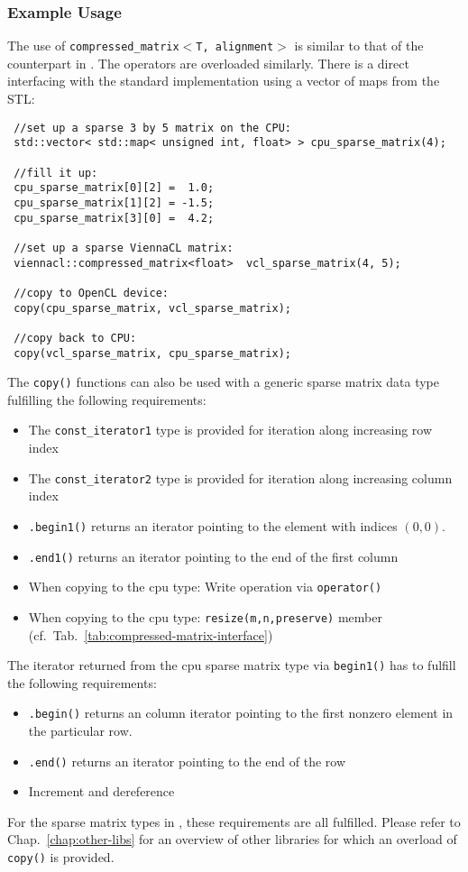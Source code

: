 \subsubsection{Example Usage} \label{sec:compressed-matrix-example}
The use of \texttt{compressed\_matrix$<$T, alignment$>$} is similar to that of the counterpart in {\ublas}. The operators are overloaded similarly.
There is a direct interfacing with the standard implementation using a vector of maps from the STL:
\begin{lstlisting}
 //set up a sparse 3 by 5 matrix on the CPU:
 std::vector< std::map< unsigned int, float> > cpu_sparse_matrix(4);

 //fill it up:
 cpu_sparse_matrix[0][2] =  1.0;
 cpu_sparse_matrix[1][2] = -1.5;
 cpu_sparse_matrix[3][0] =  4.2;

 //set up a sparse ViennaCL matrix:
 viennacl::compressed_matrix<float>  vcl_sparse_matrix(4, 5);

 //copy to OpenCL device:
 copy(cpu_sparse_matrix, vcl_sparse_matrix);

 //copy back to CPU:
 copy(vcl_sparse_matrix, cpu_sparse_matrix);
\end{lstlisting}
The \texttt{copy()} functions can also be used with a generic sparse matrix data type fulfilling the following requirements:
\begin{itemize}
 \item The \texttt{const\_iterator1} type is provided for iteration along increasing row index
 \item The \texttt{const\_iterator2} type is provided for iteration along increasing column index
 \item \texttt{.begin1()} returns an iterator pointing to the element with indices $(0,0)$.
 \item \texttt{.end1()} returns an iterator pointing to the end of the first column
 \item When copying to the cpu type: Write operation via \texttt{operator()}
 \item When copying to the cpu type: \texttt{resize(m,n,preserve)} member (cf.~Tab.~\ref{tab:compressed-matrix-interface})
\end{itemize}
The iterator returned from the cpu sparse matrix type via \texttt{begin1()} has to fulfill the following requirements:
\begin{itemize}
 \item \texttt{.begin()} returns an column iterator pointing to the first nonzero element in the particular row.
 \item \texttt{.end()} returns an iterator pointing to the end of the row
 \item Increment and dereference
\end{itemize}
For the sparse matrix types in {\ublas}, these requirements are all fulfilled. Please refer to Chap.~\ref{chap:other-libs} for an overview
of other libraries for which an overload of \texttt{copy()} is provided.

